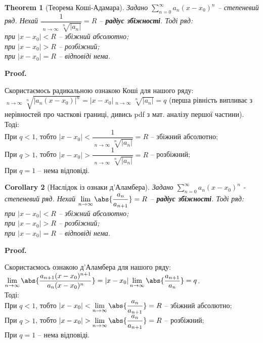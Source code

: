 \documentclass[a4paper, 10pt]{article}
\makeatletter
\DeclareMathOperator*\uplim{\overline{lim}}
\def\huge{\displaystyle}
\theoremstyle{theoremdd}
\newtheorem{theorem}{Theorem}[subsection]
\theoremstyle{theoremdd}
\theoremstyle{theoremdd}
\theoremstyle{theoremdd}
\theoremstyle{theoremdd}
\theoremstyle{theoremdd}
\theoremstyle{theoremdd}
\theoremstyle{theoremdd}
\theoremstyle{theoremdd}
\newtheorem{corollary}[theorem]{Corollary}
\renewenvironment{proof}[1][Proof.\\]{\par
\pushQED{\hfill \qed}%
\normalfont \topsep6\p@\@plus6\p@\relax
\trivlist
\item\relax
{\bfseries
#1\@addpunct{.}}\hspace\labelsep\ignorespaces
}{%
\popQED\endtrivlist\@endpefalse
}
\makeatother
\begin{document}
\begin{theorem}[Теорема Коші-Адамара]
Задано $\huge \sum_{n=0}^\infty a_n(x-x_0)^n$ -- степеневий ряд. Нехай $\dfrac{1}{\huge \uplim_{n \to \infty} \sqrt[n]{|a_n|}} = R$ -- \textbf{радіус збіжності}. Тоді ряд:\\
при $|x-x_0|<R$ -- збіжний абсолютно;\\
при $|x-x_0|>R$ -- розбіжний;\\
при $|x-x_0|=R$ -- відповіді нема.
\end{theorem}

\begin{proof}
Скористаємось радикальною ознакою Коші для нашого ряду:\\
$\huge \uplim_{n \to \infty} \sqrt[n]{|a_n(x-x_0)|^n} = |x-x_0| \uplim_{n \to \infty} \sqrt[n]{|a_n|} = q$ (перша рівність випливає з нерівностей про часткові границі, дивись pdf з мат. аналізу першої частини). Тоді:\\
При $q < 1$, тобто $|x-x_0| < \dfrac{1}{\huge \uplim_{n \to \infty} \sqrt[n]{|a_n|}} = R$ -- збіжний абсолютно;\\
При $q > 1$, тобто $|x-x_0| > \dfrac{1}{\huge \uplim_{n \to \infty} \sqrt[n]{|a_n|}} = R$ -- розбіжний;\\
При $q = 1$ -- нема відповіді.
\end{proof}

\begin{corollary}[Наслідок із ознаки д'Аламбера]
Задано $\huge \sum_{n=0}^\infty a_n(x-x_0)^n$ - степеневий ряд. Нехай $\huge \lim_{n \to \infty} \abs{\dfrac{a_n}{a_{n+1}}} = R$ -- \textbf{радіус збіжності}. Тоді ряд:\\
при $|x-x_0|<R$ -- збіжний абсолютно;\\
при $|x-x_0|>R$ -- розбіжний;\\
при $|x-x_0|=R$ -- відповіді нема.
\end{corollary}

\begin{proof}
Скористаємось ознакою д'Аламбера для нашого ряду:\\
$\huge \lim_{n \to \infty} \abs{\dfrac{a_{n+1}(x-x_0)^{n+1}}{a_n(x-x_0)^n}} = |x-x_0| \lim_{n \to \infty} \abs{\dfrac{a_{n+1}}{a_n}} = q$.\\
Тоді:\\
При $q < 1$, тобто $|x-x_0| < \huge \lim_{n \to \infty} \abs{\dfrac{a_n}{a_{n+1}}} = R$ -- збіжний абсолютно;\\
При $q > 1$, тобто $|x-x_0| > \huge \lim_{n \to \infty} \abs{\dfrac{a_n}{a_{n+1}}} = R$ -- розбіжний;\\
При $q = 1$ -- нема відповіді.
\end{proof}
\end{document}

